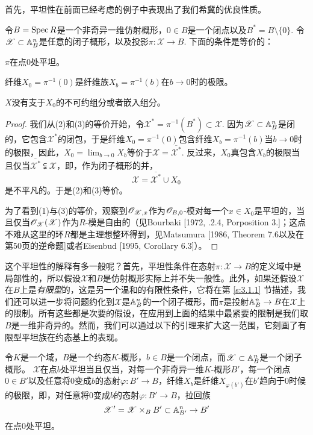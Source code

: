 首先，平坦性在前面已经考虑的例子中表现出了我们希冀的优良性质。

\begin{pro}\label{pro:2.29}
	令$B=\operatorname{Spec} R$是一个非奇异一维仿射概形，$0\in B$是一个闭点以及$B^*=B\setminus \{0\}$. 令$\mathscr{X}\subset \mathbb{A}_{B}^n$是任意的闭子概形，以及投影$\pi:\mathscr{X}\to B$. 下面的条件是等价的：
	\begin{compactenum}[\((1)\)]
		\item $\pi$在点$0$处平坦。
		\item 纤维$X_0=\pi^{-1}(0)$是纤维族$X_b=\pi^{-1}(b)$在$b\to 0$时的极限。
		\item $X$没有支于$X_0$的不可约组分或者嵌入组分。
	\end{compactenum}
\end{pro}

\begin{proof}
我们从(2)和(3)的等价开始，令$\mathscr{X}^*=\pi^{-1}(B^*)\subset \mathscr{X}$. 因为$\mathscr{X}\subset \mathbb{A}_B^n$是闭的，它包含$\mathscr{X}^*$的闭包，于是纤维$X_0=\pi^{-1}(0)$包含纤维$X_b=\pi^{-1}(b)$当$b\to 0$时的极限，因此，$X_0=\lim_{b\to 0} X_b$等价于$\mathscr{X}=\overline{\mathscr{X}^*}$. 反过来，$X_0$真包含$X_b$的极限当且仅当$\overline{\mathscr{X}^*} \subsetneqq \mathscr{X}$，即，作为闭子概形的并，
\[
	\mathscr{X}=\overline{\mathscr{X}^*}\cup X_0
\]
是不平凡的。于是(2)和(3)等价。

为了看到(1)与(3)的等价，观察到$\mathscr{O}_{\mathscr{X},x}$作为$\mathscr{O}_{B,0}$\hyp 模对每一个$x\in X_0$是平坦的，当且仅当$\mathscr{O}_{\mathscr{X}}(\mathscr{X})$作为$R$\hyp 模是自由的（见Bourbaki [1972, \uppercase\expandafter{}.2.4, Porposition 3.\expandafter{}]；这点不难从这里的环$R$都是主理想整环得到，见Matsumura [1986, Theorem 7.6以及在第50页的逆命题]或者Eisenbud [1995, Corollary 6.3]）。
\end{proof}

这个平坦性的解释有多一般呢？首先，平坦性条件在态射$\pi:\mathscr{X}\to B$的定义域中是局部性的，所以假设$\mathscr{X}$和$B$是仿射概形实际上并不失一般性。此外，如果还假设$\mathscr{X}$在$B$上是\textit{有限型}的，这是另一个温和的有限性条件，它将在第 \ref{s:3.1.1} 节描述，我们还可以进一步将问题约化到$\mathscr{X}$是$\mathbb{A}_B^n$的一个闭子概形，而$\pi$是投射$\mathbb{A}_B^n\to B$在$\mathscr{X}$上的限制。所有这些都是次要的假设，在应用到上面的结果中最紧要的限制是我们取$B$是一维非奇异的。然而，我们可以通过以下的引理来扩大这一范围，它刻画了有限型平坦族在约态基上的表现。

\begin{lem}\label{lem:2.30}
	令$K$是一个域，$B$是一个约态$K$\hyp 概形，$b\in B$是一个闭点，而$\mathscr{X}\subset \mathbb{A}_{B}^n$是一个闭子概形。 $\mathscr{X}$在点$b$处平坦当且仅当，对每一个非奇异一维$K$\hyp 概形$B'$，每一个闭点$0\in B'$以及任意将$0$变成$b$的态射$\varphi:B'\to B$，纤维$X_b$是纤维$X_{\varphi(b')}$在$b'$趋向于$0$时候的极限，即，对任意将$0$变成$b$的态射$\varphi:B'\to B$，拉回族
	\[
	\mathscr{X}'=\mathscr{X}\times_B B'\subset \mathbb{A}_{B'}^n\to B'
	\]
	在点$0$处平坦。
\end{lem}

